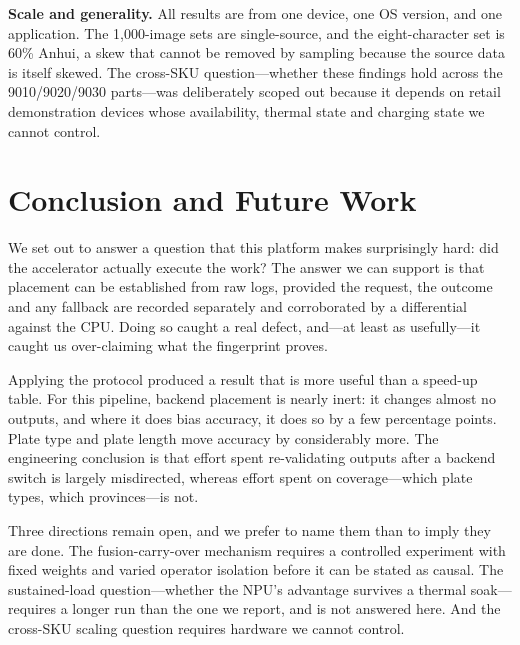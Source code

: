 \documentclass[conference]{IEEEtran}
\begin{document}
\textbf{Scale and generality.} All results are from one device, one OS version,
and one application. The 1{,}000-image sets are single-source, and the
eight-character set is 60\% Anhui, a skew that cannot be removed by sampling
because the source data is itself skewed. The cross-SKU question---whether these
findings hold across the 9010/9020/9030 parts---was deliberately scoped out
because it depends on retail demonstration devices whose availability, thermal
state and charging state we cannot control.

\section{Conclusion and Future Work}

We set out to answer a question that this platform makes surprisingly hard: did
the accelerator actually execute the work? The answer we can support is that
placement can be established from raw logs, provided the request, the outcome
and any fallback are recorded separately and corroborated by a differential
against the CPU. Doing so caught a real defect, and---at least as usefully---it
caught us over-claiming what the fingerprint proves.

Applying the protocol produced a result that is more useful than a speed-up
table. For this pipeline, backend placement is nearly inert: it changes almost
no outputs, and where it does bias accuracy, it does so by a few percentage
points. Plate type and plate length move accuracy by considerably more. The
engineering conclusion is that effort spent re-validating outputs after a
backend switch is largely misdirected, whereas effort spent on coverage---which
plate types, which provinces---is not.

Three directions remain open, and we prefer to name them than to imply they are
done. The fusion-carry-over mechanism requires a controlled experiment with
fixed weights and varied operator isolation before it can be stated as causal.
The sustained-load question---whether the NPU's advantage survives a thermal
soak---requires a longer run than the one we report, and is not answered here.
And the cross-SKU scaling question requires hardware we cannot control.
\end{document}
